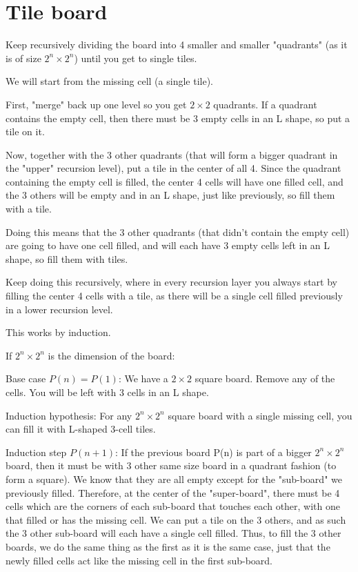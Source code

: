 \documentclass[11pt,letterpaper]{article}
\begin{document}
	\section{Tile board}
		Keep recursively dividing the board into 4 smaller and smaller "quadrants" (as it is of size $2^n \times 2^n$) until you get to single tiles.
		
		We will start from the missing cell (a single tile).
		
		First, "merge" back up one level so you get $2 \times 2$ quadrants.
		If a quadrant contains the empty cell, then there must be 3 empty cells in an L shape, so put a tile on it.
		
		Now, together with the 3 other quadrants (that will form a bigger quadrant in the "upper" recursion level), put a tile in the center of all 4.
		Since the quadrant containing the empty cell is filled, the center 4 cells will have one filled cell, and the 3 others will be empty and in an L shape, just like previously, so fill them with a tile.
		
		Doing this means that the 3 other quadrants (that didn't contain the empty cell) are going to have one cell filled, and will each have 3 empty cells left in an L shape, so fill them with tiles.
		
		Keep doing this recursively, where in every recursion layer you always start by filling the center 4 cells with a tile, as there will be a single cell filled previously in a lower recursion level.
		
		This works by induction.
		
		If $2^n \times 2^n$ is the dimension of the board:
		
		Base case $P(n)=P(1)$: We have a $2 \times 2$ square board. Remove any of the cells. You will be left with 3 cells in an L shape.
		
		Induction hypothesis: For any $2^n \times 2^n$ square board with a single missing cell, you can fill it with L-shaped 3-cell tiles.
		
		Induction step $P(n+1)$: If the previous board P(n) is part of a bigger $2^n \times 2^n$ board, then it must be with 3 other same size board in a quadrant fashion (to form a square). We know that they are all empty except for the "sub-board" we previously filled. Therefore, at the center of the "super-board", there must be 4 cells which are the corners of each sub-board that touches each other, with one that filled or has the missing cell. We can put a tile on the 3 others, and as such the 3 other sub-board will each have a single cell filled. Thus, to fill the 3 other boards, we do the same thing as the first as it is the same case, just that the newly filled cells act like the missing cell in the first sub-board.
	
\end{document}
